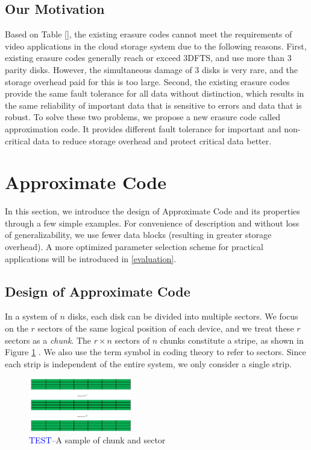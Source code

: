\documentclass[sigconf]{acmart}
\begin{document}
\subsection{Our Motivation}
Based on Table [], the existing erasure codes cannot meet the requirements of video applications in the cloud storage system due to the following reasons. First, existing erasure codes generally reach or exceed 3DFTS, and use more than 3 parity disks. However, the simultaneous damage of 3 disks is very rare, and the storage overhead paid for this is too large. Second, the existing erasure codes provide the same fault tolerance for all data without distinction, which results in the same reliability of important data that is sensitive to errors and data that is robust. To solve these two problems, we propose a new erasure code called approximation code. It provides different fault tolerance for important and non-critical data to reduce storage overhead and protect critical data better.

\section{Approximate Code}
In this section, we introduce the design of Approximate Code and its properties through a few simple examples. For convenience of description and without loss of generalizability, we use fewer data blocks (resulting in greater storage overhead). A more optimized parameter selection scheme for practical applications will be introduced in \ref{evaluation}.

\subsection{Design of Approximate Code}
In a system of $n$ disks, each disk can be divided into multiple sectors. We focus on the $r$ sectors of the same logical position of each device, and we treat these $r$ sectors as a \emph{chunk}. The $r \times n$ sectors of $n$ chunks constitute a stripe, as shown in Figure \ref{TEST-chunk-sector} . We also use the term symbol in coding theory to refer to sectors. Since each strip is independent of the entire system, we only consider a single strip.

\begin{figure}[ht]
\centering
\includegraphics[width=0.4\textwidth]{photo/TEST-chunk-sector.JPG}
\caption{\textcolor{blue}{TEST--}A sample of chunk and sector}
\label{TEST-chunk-sector}
\end{figure}
\end{document}

